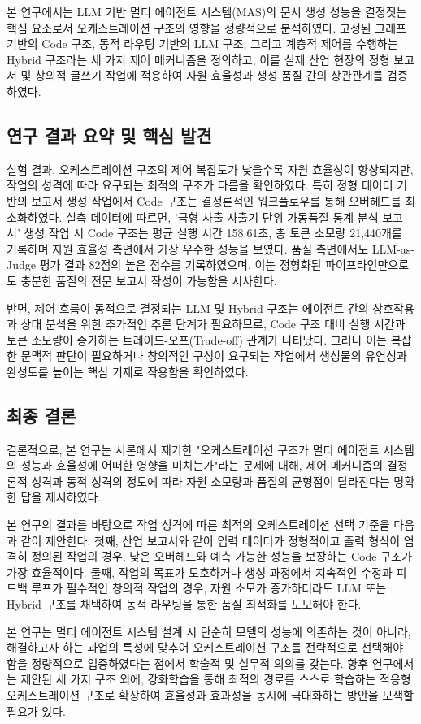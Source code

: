 본 연구에서는 LLM 기반 멀티 에이전트 시스템(MAS)의 문서 생성 성능을 결정짓는 핵심 요소로서 오케스트레이션 구조의 영향을 정량적으로 분석하였다. 고정된 그래프 기반의 Code 구조, 동적 라우팅 기반의 LLM 구조, 그리고 계층적 제어를 수행하는 Hybrid 구조라는 세 가지 제어 메커니즘을 정의하고, 이를 실제 산업 현장의 정형 보고서 및 창의적 글쓰기 작업에 적용하여 자원 효율성과 생성 품질 간의 상관관계를 검증하였다.

\subsection{연구 결과 요약 및 핵심 발견}

실험 결과, 오케스트레이션 구조의 제어 복잡도가 낮을수록 자원 효율성이 향상되지만, 작업의 성격에 따라 요구되는 최적의 구조가 다름을 확인하였다. 특히 정형 데이터 기반의 보고서 생성 작업에서 Code 구조는 결정론적인 워크플로우를 통해 오버헤드를 최소화하였다. 실측 데이터에 따르면, '금형-사출-사출기-단위-가동품질-통계-분석-보고서' 생성 작업 시 Code 구조는 평균 실행 시간 158.61초, 총 토큰 소모량 21,440개를 기록하며 자원 효율성 측면에서 가장 우수한 성능을 보였다. 품질 측면에서도 LLM-as-Judge 평가 결과 82점의 높은 점수를 기록하였으며, 이는 정형화된 파이프라인만으로도 충분한 품질의 전문 보고서 작성이 가능함을 시사한다.

반면, 제어 흐름이 동적으로 결정되는 LLM 및 Hybrid 구조는 에이전트 간의 상호작용과 상태 분석을 위한 추가적인 추론 단계가 필요하므로, Code 구조 대비 실행 시간과 토큰 소모량이 증가하는 트레이드-오프(Trade-off) 관계가 나타났다. 그러나 이는 복잡한 문맥적 판단이 필요하거나 창의적인 구성이 요구되는 작업에서 생성물의 유연성과 완성도를 높이는 핵심 기제로 작용함을 확인하였다.

\subsection{최종 결론}

결론적으로, 본 연구는 서론에서 제기한 "오케스트레이션 구조가 멀티 에이전트 시스템의 성능과 효율성에 어떠한 영향을 미치는가"라는 문제에 대해, 제어 메커니즘의 결정론적 성격과 동적 성격의 정도에 따라 자원 소모량과 품질의 균형점이 달라진다는 명확한 답을 제시하였다.

본 연구의 결과를 바탕으로 작업 성격에 따른 최적의 오케스트레이션 선택 기준을 다음과 같이 제안한다. 첫째, 산업 보고서와 같이 입력 데이터가 정형적이고 출력 형식이 엄격히 정의된 작업의 경우, 낮은 오버헤드와 예측 가능한 성능을 보장하는 Code 구조가 가장 효율적이다. 둘째, 작업의 목표가 모호하거나 생성 과정에서 지속적인 수정과 피드백 루프가 필수적인 창의적 작업의 경우, 자원 소모가 증가하더라도 LLM 또는 Hybrid 구조를 채택하여 동적 라우팅을 통한 품질 최적화를 도모해야 한다.

본 연구는 멀티 에이전트 시스템 설계 시 단순히 모델의 성능에 의존하는 것이 아니라, 해결하고자 하는 과업의 특성에 맞추어 오케스트레이션 구조를 전략적으로 선택해야 함을 정량적으로 입증하였다는 점에서 학술적 및 실무적 의의를 갖는다. 향후 연구에서는 제안된 세 가지 구조 외에, 강화학습을 통해 최적의 경로를 스스로 학습하는 적응형 오케스트레이션 구조로 확장하여 효율성과 효과성을 동시에 극대화하는 방안을 모색할 필요가 있다.